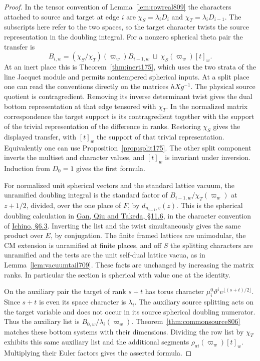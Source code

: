 \documentclass[a4paper,11pt]{article}
\theoremstyle{definition}
\theoremstyle{remark}
\numberwithin{equation}{section}
\begin{document}
\begin{proof}
In the tensor convention of Lemma~\ref{lem:rowreal809} the
characters attached to source and target at edge \(i\) are
\(\chi_S=\lambda_iD_i\) and \(\chi_T=\lambda_iD_{i-1}\).
The subscripts here refer to the two spaces, so the target
character twists the source representation in the doubling
integral. For a nonzero spherical theta pair the transfer is
\[
 B_{i,w}=(\chi_S/\chi_T)(\varpi_w)B_{i-1,w}
                    \ \sqcup\ \chi_S(\varpi_w)[t]_w .
\]
At an inert place this is Theorem~\ref{thm:inert175}, which
uses the two strata of the line Jacquet module and permits
nontempered spherical inputs. At a split place one can read
the conventions directly on the matrices \(hXg^{-1}\).
The physical source quotient is contragredient. Removing its
inverse determinant twist gives the dual bottom representation
at that edge tensored with \(\chi_T\). In the normalized matrix
correspondence the target support is its contragredient together
with the support of the trivial representation of the difference
in ranks. Restoring \(\chi_S\) gives the displayed transfer,
with \([t]_w\) the support of that trivial representation.
Equivalently one can use Proposition~\ref{prop:split175}.
The other split component inverts the multiset and character
values, and \([t]_w\) is invariant under inversion.
Induction from \(D_0=1\) gives the first formula.

For normalized unit spherical vectors and the standard lattice
vacuum, the unramified doubling integral is the standard factor
of \(B_{i-1,w}/\chi_T(\varpi_w)\) at \(z+1/2\), divided, over
the one place of \(F\), by \(d_{n_{i-1},v}(z)\). This is the
spherical doubling calculation in
\href{https://arxiv.org/pdf/1207.4709}{Gan, Qiu and Takeda,
\S11.6}, in the character convention of
\href{https://arxiv.org/pdf/2002.09148}{Ichino, \S6.3}.
Inverting the list and the twist simultaneously gives the same
product over \(E\), by conjugation. The finite framed lattices
are unimodular, the CM extension is unramified at finite places,
and off \(S\) the splitting characters are unramified and the
tests are the unit self-dual lattice vacua, as in
Lemma~\ref{lem:vacuumtail709}. These facts are unchanged by
increasing the matrix ranks. In particular the section is
spherical with value one at the identity.

On the auxiliary pair the target of rank \(s+t\) has torus
character \(\mu_i^0\vartheta^i\upsilon^{\lfloor(s+t)/2\rfloor}\).
Since \(s+t\) is even its space character is \(\lambda_i\).
The auxiliary source splitting acts on the target variable and
does not occur in its source spherical doubling numerator. Thus
the auxiliary list is \(B_{0,w}/\lambda_i(\varpi_w)\).
Theorem~\ref{thm:commonsource806} matches these bottom systems
with their dimensions. Dividing the row list by \(\chi_T\)
exhibits this same auxiliary list and the additional segments
\(\rho_{ai}(\varpi_w)[t]_w\). Multiplying their Euler factors
gives the asserted formula.
\end{proof}
\end{document}

